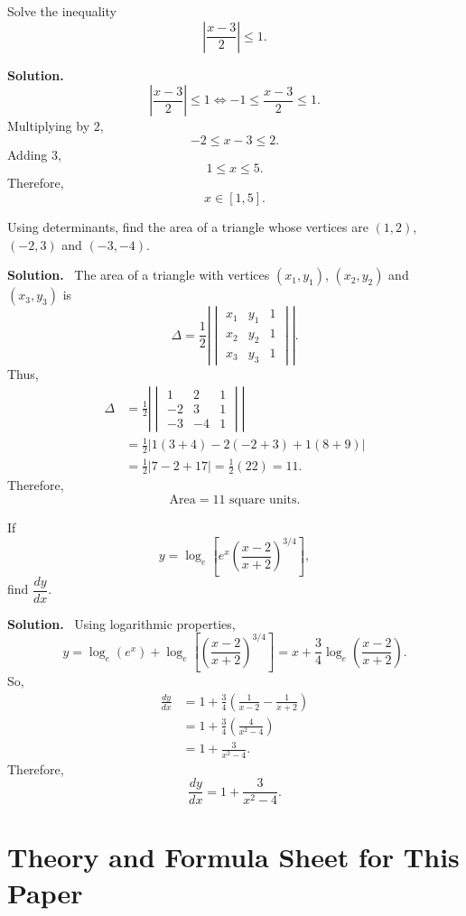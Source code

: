 \documentclass[11pt,a4paper]{article}
\newcommand{\question}[2]{\begin{tcolorbox}[breakable,colback=gray!5,colframe=black!35,title=\textbf{Question #1}]#2\end{tcolorbox}}
\newcommand{\answer}{\textbf{Solution.}\ }
\begin{document}
\question{5(b)}{Solve the inequality
\[
\left|\frac{x-3}{2}\right|\le1.
\]}
\answer
\[
\left|\frac{x-3}{2}\right|\le1
\iff -1\le\frac{x-3}{2}\le1.
\]
Multiplying by $2$,
\[
-2\le x-3\le2.
\]
Adding $3$,
\[
1\le x\le5.
\]
Therefore,
\[
\boxed{x\in[1,5].}
\]

\begin{center}
\end{center}

\question{5(c)}{Using determinants, find the area of a triangle whose vertices are $(1,2)$, $(-2,3)$ and $(-3,-4)$.}
\answer
The area of a triangle with vertices $(x_1,y_1)$, $(x_2,y_2)$ and $(x_3,y_3)$ is
\[
\Delta=\frac12\left|
\begin{vmatrix}
x_1&y_1&1\\
x_2&y_2&1\\
x_3&y_3&1
\end{vmatrix}
\right|.
\]
Thus,
\begin{align*}
\Delta&=\frac12\left|
\begin{vmatrix}
1&2&1\\
-2&3&1\\
-3&-4&1
\end{vmatrix}
\right|\\
&=\frac12|1(3+4)-2(-2+3)+1(8+9)|\\
&=\frac12|7-2+17|=\frac12(22)=11.
\end{align*}
Therefore,
\[
\boxed{\text{Area}=11\text{ square units}.}
\]

\question{5(d)}{If
\[
y=\log_e\left[e^x\left(\frac{x-2}{x+2}\right)^{3/4}\right],
\]
find $\dfrac{dy}{dx}$.}
\answer
Using logarithmic properties,
\[
y=\log_e(e^x)+\log_e\left[\left(\frac{x-2}{x+2}\right)^{3/4}\right]
=x+\frac34\log_e\left(\frac{x-2}{x+2}\right).
\]
So,
\begin{align*}
\frac{dy}{dx}
&=1+\frac34\left(\frac{1}{x-2}-\frac{1}{x+2}\right)\\
&=1+\frac34\left(\frac{4}{x^2-4}\right)\\
&=1+\frac{3}{x^2-4}.
\end{align*}
Therefore,
\[
\boxed{\frac{dy}{dx}=1+\frac{3}{x^2-4}.}
\]

\newpage
\section*{Theory and Formula Sheet for This Paper}
\end{document}
